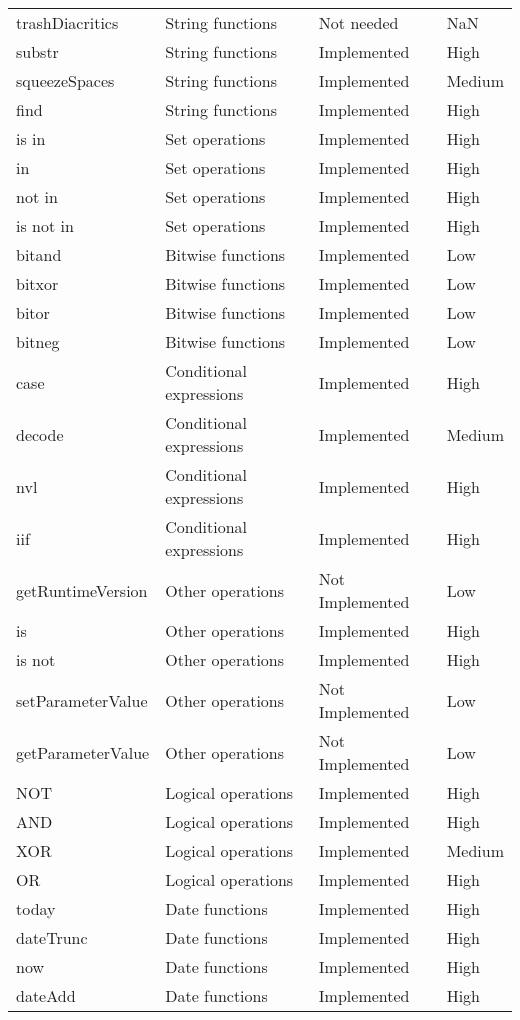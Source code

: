\begin{longtable}{llll}
trashDiacritics & String functions & Not needed & NaN \\
substr & String functions & Implemented & High \\
squeezeSpaces & String functions & Implemented & Medium \\
find & String functions & Implemented & High \\
is in & Set operations & Implemented & High \\
in & Set operations & Implemented & High \\
not in & Set operations & Implemented & High \\
is not in & Set operations & Implemented & High \\
bitand & Bitwise functions & Implemented & Low \\
bitxor & Bitwise functions & Implemented & Low \\
bitor & Bitwise functions & Implemented & Low \\
bitneg & Bitwise functions & Implemented & Low \\
case & Conditional expressions & Implemented & High \\
decode & Conditional expressions & Implemented & Medium \\
nvl & Conditional expressions & Implemented & High \\
iif & Conditional expressions & Implemented & High \\
getRuntimeVersion & Other operations & Not Implemented & Low \\
is & Other operations & Implemented & High \\
is not & Other operations & Implemented & High \\
setParameterValue & Other operations & Not Implemented & Low \\
getParameterValue & Other operations & Not Implemented & Low \\
NOT & Logical operations & Implemented & High \\
AND & Logical operations & Implemented & High \\
XOR & Logical operations & Implemented & Medium \\
OR & Logical operations & Implemented & High \\
today & Date functions & Implemented & High \\
dateTrunc & Date functions & Implemented & High \\
now & Date functions & Implemented & High \\
dateAdd & Date functions & Implemented & High \\

\end{longtable}
